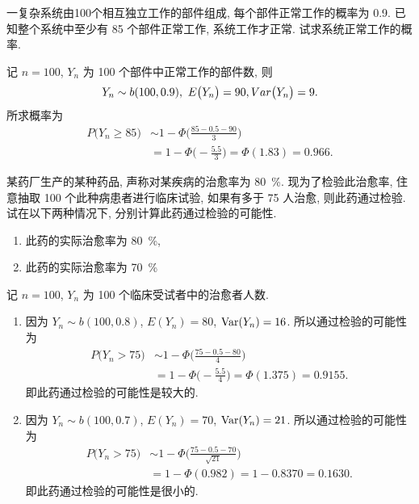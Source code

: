 \begin{example}\label{exam:4.4.5}
    一复杂系统由100个相互独立工作的部件组成, 每个部件正常工作的概率为 0.9.
    已知整个系统中至少有 85 个部件正常工作, 系统工作才正常.
    试求系统正常工作的概率.
\end{example}

\begin{solution}
    记 $ n = 100 $, $ Y_n $ 为 100 个部件中正常工作的部件数, 则
    \begin{equation*}
        Y_n \sim b (100, 0.9), \ E \bigl( Y_n \bigr) = 90, \\Var  \bigl( Y_n \bigr) = 9.
    \end{equation*}
    所求概率为
    \begin{align*}
        P \bigl( Y_n \geq 85 \bigr) & \sim 1 - \Phi \biggl( \frac{85 - 0.5 - 90}{3} \biggr)\\
        & = 1 - \Phi \biggl( - \frac{5.5}{3} \biggr)
        = \Phi (1.83) = 0.966.
    \end{align*}
\end{solution}

\begin{example}\label{exam:4.4.6}
    某药厂生产的某种药品, 声称对某疾病的治愈率为 \SI{80}{\percent}.
    现为了检验此治愈率, 住意抽取 100 个此种病患者进行临床试验, 如果有多于 75 人治愈, 则此药通过检验.
    试在以下两种情况下, 分别计算此药通过检验的可能性.
    \begin{enumerate}
        \item 此药的实际治愈率为 \SI{80}{\percent},
        \item 此药的实际治愈率为 \SI{70}{\percent}
    \end{enumerate}
\end{example}

\begin{solution}
    记 $ n = 100 $, $ Y_n $ 为 100 个临床受试者中的治愈者人数.
    \begin{enumerate}
        \item 因为 $ Y_n \sim b (100, 0.8) $, $ E (Y_n) = 80 $, $\operatorname{Var}  (Y_n) = 16 $.
        所以通过检验的可能性为
        \begin{align*}
            P \bigl( Y_n > 75 \bigr) & \sim 1 - \Phi \biggl(\frac{75 - 0.5 - 80}{4} \biggr)\\
            & = 1 - \Phi \biggl( -\frac{5.5}{4} \biggr)
            = \Phi (1.375) = 0.9155.
        \end{align*}
        即此药通过检验的可能性是较大的.

        \item 因为 $ Y_n \sim b (100, 0.7) $, $ E (Y_n) = 70 $, $\operatorname{Var}  (Y_n) = 21 $.
        所以通过检验的可能性为
        \begin{align*}
            P \bigl( Y_n > 75 \bigr) & \sim 1 - \Phi \biggl(\frac{75 - 0.5 - 70}{\sqrt{21}} \biggr)\\
            & = 1 - \Phi ( 0.982 )
            = 1-0.8370 = 0.1630.
        \end{align*}
        即此药通过检验的可能性是很小的.
    \end{enumerate}
\end{solution}

